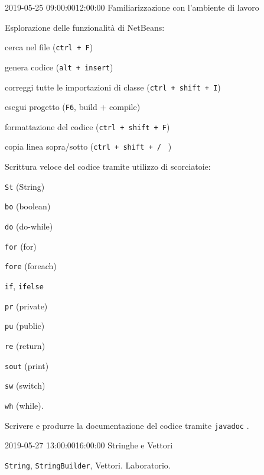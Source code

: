 \documentclass[twoside, symmetric]{tufte-book}
\begin{document}
\begin{lezione}
	{2019-05-25}
	{09:00:00}{12:00:00}
	{Familiarizzazione con l'ambiente di lavoro}

Esplorazione delle funzionalità di NetBeans:
\begin{enumerate*}[label={\arabic*.}]
	\item cerca nel file (\texttt{ctrl\,+\,F})
	\item genera codice (\texttt{alt\,+\,insert})
	\item correggi tutte le importazioni di classe (\texttt{ctrl\,+\,shift\,+\,I})
	\item esegui progetto (\texttt{F6}, build + compile)
	\item formattazione del codice (\texttt{ctrl\,+\,shift\,+\,F})
	\item copia linea sopra/sotto (\texttt{ctrl\,+\,shift\,+ \arrowkeyup{} / \arrowkeydown{}} )
\end{enumerate*}

Scrittura veloce del codice tramite utilizzo di scorciatoie:
\begin{enumerate*}[label={\arabic*.}]
	\item \texttt{St} (String)
	\item \texttt{bo} (boolean)
	\item \texttt{do} (do-while)
	\item \texttt{for} (for)
	\item \texttt{fore} (foreach)
	\item \texttt{if}, \texttt{ifelse}
	\item \texttt{pr} (private)
	\item \texttt{pu} (public)
	\item \texttt{re} (return)
	\item \texttt{sout} (print)
	\item \texttt{sw} (switch)
	\item \texttt{wh} (while).
\end{enumerate*}

Scrivere e produrre la documentazione del codice tramite \texttt{javadoc} .

\end{lezione}

\begin{lezione}
	{2019-05-27}
	{13:00:00}{16:00:00}
	{Stringhe e Vettori}

\texttt{String}, \texttt{StringBuilder}, Vettori.
Laboratorio.

\end{lezione}
\end{document}
